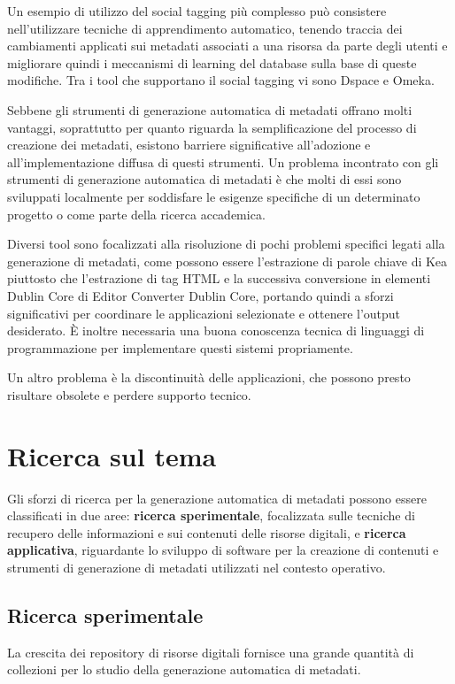Un esempio di utilizzo del social tagging più complesso può consistere nell'utilizzare tecniche di apprendimento automatico, tenendo traccia dei cambiamenti applicati sui metadati associati a una risorsa da parte degli utenti e migliorare quindi i meccanismi di learning del database sulla base di queste modifiche.
Tra i tool che supportano il social tagging vi sono Dspace e Omeka.

Sebbene gli strumenti di generazione automatica di metadati offrano molti vantaggi, soprattutto per quanto riguarda la semplificazione del processo di creazione dei metadati, esistono barriere significative all'adozione e all'implementazione diffusa di questi strumenti. Un problema incontrato con gli strumenti di generazione automatica di metadati è che molti di essi sono sviluppati localmente per soddisfare le esigenze specifiche di un determinato progetto o come parte della ricerca accademica.

Diversi tool sono focalizzati alla risoluzione di pochi problemi specifici legati alla generazione di metadati, come possono essere l'estrazione di parole chiave di Kea piuttosto che l'estrazione di tag HTML e la successiva conversione in elementi Dublin Core di Editor Converter Dublin Core, portando quindi a sforzi significativi per coordinare le applicazioni selezionate e ottenere l'output desiderato.
È inoltre necessaria una buona conoscenza tecnica di linguaggi di programmazione per implementare questi sistemi propriamente.

Un altro problema è la discontinuità delle applicazioni, che possono presto risultare obsolete e perdere supporto tecnico.

\section{Ricerca sul tema}
Gli sforzi di ricerca per la generazione automatica di metadati possono essere classificati in due aree: \textbf{ricerca sperimentale}, focalizzata sulle tecniche di recupero delle informazioni e sui contenuti delle risorse digitali, e \textbf{ricerca applicativa}, riguardante lo sviluppo di software per la creazione di contenuti e strumenti di generazione di metadati utilizzati nel contesto operativo\cite{amega}.

\subsection{Ricerca sperimentale}
La crescita dei repository di risorse digitali fornisce una grande quantità di collezioni per lo studio della generazione automatica di metadati.

